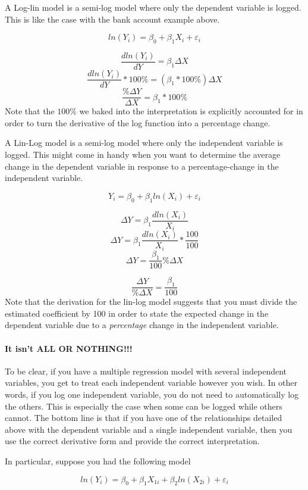 \documentclass[
]{book}
\begin{document}
A Log-lin model is a semi-log model where only the dependent variable is logged. This is like the case with the bank account example above.

\[ln(Y_i)=\beta_0 + \beta_1 X_i + \varepsilon_i\]

\[\frac{dln(Y_i)}{dY} = \beta_1 \Delta X\]
\[\frac{dln(Y_i)}{dY} * 100\% = (\beta_1 * 100\%)\Delta X\]
\[\frac{\% \Delta Y}{\Delta X}= \beta_1 * 100\%\]
Note that the \(100\%\) we baked into the interpretation is explicitly accounted for in order to turn the derivative of the log function into a percentage change.

A Lin-Log model is a semi-log model where only the independent variable is logged. This might come in handy when you want to determine the average change in the dependent variable in response to a percentage-change in the independent variable.

\[Y_i=\beta_0 + \beta_1 ln(X_i) + \varepsilon_i\]

\[\Delta Y=\beta_1 \frac{dln(X_i)}{X_i}\]
\[\Delta Y=\beta_1 \frac{dln(X_i)}{X_i}*\frac{100}{100}\]
\[\Delta Y=\frac{\beta_1}{100} \%\Delta X\]

\[\frac{\Delta Y}{\%\Delta X}=\frac{\beta_1}{100} \]
Note that the derivation for the lin-log model suggests that you must divide the estimated coefficient by 100 in order to state the expected change in the dependent variable due to a \emph{percentage} change in the independent variable.

\hypertarget{it-isnt-all-or-nothing}{%
\paragraph*{It isn't ALL OR NOTHING!!!}\label{it-isnt-all-or-nothing}}

To be clear, if you have a multiple regression model with several independent variables, you get to treat each independent variable however you wish. In other words, if you log one independent variable, you do not need to automatically log the others. This is especially the case when some can be logged while others cannot. The bottom line is that if you have one of the relationships detailed above with the dependent variable and a single independent variable, then you use the correct derivative form and provide the correct interpretation.

In particular, suppose you had the following model

\[ln(Y_i)=\beta_0 + \beta_1 X_{1i} + \beta_2 ln(X_{2i}) + \varepsilon_i\]
\end{document}
